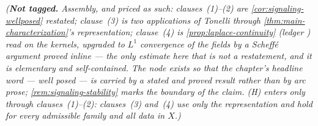 \begin{corollary}
\begin{enumerate}
\end{enumerate}
\statusT\quad\emph{(\textbf{Not tagged.} Assembly, and priced as such: clauses~(1)--(2) are
\ref{cor:signaling-wellposed} restated; clause~(3) is two applications of Tonelli through
\ref{thm:main-characterization}'s representation; clause~(4) is \ref{prop:laplace-continuity}
(ledger ) read on the kernels, upgraded to $L^1$ convergence of the fields by a
Scheffé argument proved inline --- the only estimate here that is not a restatement, and it
is elementary and self-contained. The node exists so that the chapter's headline word ---
\emph{well posed} --- is carried by a stated and proved result rather than by arc prose;
\ref{rem:signaling-stability} marks the boundary of the claim. (H) enters only through
clauses~(1)--(2): clauses~(3) and~(4) use only the representation and hold for every
admissible family and all data in $X$.)}
\end{corollary}

